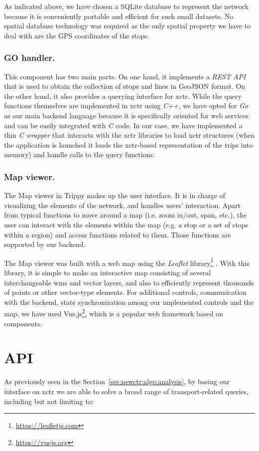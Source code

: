    As indicated above, we have chosen  a SQLite database to represent the network because it is conveniently portable and efficient for such small datasets. No spatial database technology was required as the only spatial property we have to deal with are the GPS coordinates of the  stops.
    
    \subsubsection{\bf GO handler.}
    This component has two main parts. On one hand, it implements a {\em REST API} that is used to obtain the collection of stops and lines in GeoJSON format. On the other hand, it also provides a querying interface for \gls{xctr}. While the query functions themselves are implemented in \gls{xctr} using {\em C++}, we have opted for {\em Go} as our main backend language because it is specifically oriented for web services and can be easily integrated with {\em C} code. In our case, we have implemented a thin {\em C wrapper} that interacts with the \gls{xctr} libraries to load \gls{xctr} structures (when the application is launched it loads the \gls{xctr}-based representation of the trips into memory) and handle calls to the query functions.
    
    \subsubsection{\bf Map viewer.}
    The Map viewer in Trippy makes up the user interface. It is in charge of visualizing the elements of the network, and handles users’ interaction. Apart from typical functions to move around a map (i.e. zoom in/out, span, etc.), the user can interact with the elements within the map (e.g. a stop or a set of stops within a region) and access functions related to them. Those functions are supported by our backend.
    
    The Map viewer was built with a web map using the {\em Leaflet} library\footnote{\url{https://leafletjs.com}} . With this library, it is simple to make an interactive map consisting of several interchangeable \gls{wms} and vector layers, and also to efficiently represent thousands of points or other vector-type elements.
    For additional controls, communication with the backend, state synchronization among our implemented controls and the map, we have used Vue.js\footnote{\url{https://vuejs.org}}, which is a popular web framework based on components.

	
	\section{API}
	\label{sec:api}
    As previously seen in the Section~\ref{sec:newctr:algo:analysis}, by basing our interface on \gls{xctr} we are able to solve a broad range of transport-related queries, including but not limiting to:

